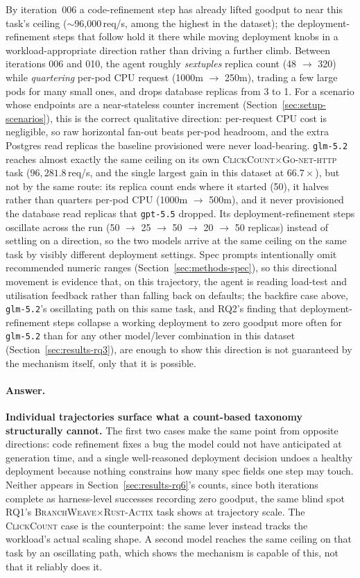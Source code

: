 By iteration~006 a code-refinement step has already lifted goodput to near this
task's ceiling ($\sim$96{,}000\,req/s, among the highest in the dataset);
the deployment-refinement steps that follow hold it there while moving deployment knobs in
a workload-appropriate direction rather than driving a further climb.
Between iterations 006 and 010, the agent roughly \emph{sextuples}
replica count (48 $\to$ 320) while \emph{quartering} per-pod CPU request
(1000m $\to$ 250m), trading a few large pods for many small ones, and
drops database replicas from 3 to 1. For a scenario whose endpoints are a
near-stateless counter increment (Section~\ref{sec:setup-scenarios}),
this is the correct qualitative direction: per-request CPU cost is
negligible, so raw horizontal fan-out beats per-pod headroom, and the
extra Postgres read replicas the baseline provisioned were never
load-bearing. \texttt{glm-5.2} reaches almost exactly the same ceiling on
its own \textsc{ClickCount}$\times$\textsc{Go-net-http} task
($96{,}281.8$\,req/s, and the single largest gain in this dataset at
$66.7\times$), but not by the same route: its replica count ends where it
started (50), it halves rather than quarters per-pod CPU
(1000m $\to$ 500m), and it never provisioned the database read replicas
that \texttt{gpt-5.5} dropped. Its deployment-refinement steps oscillate across the run
(50 $\to$ 25 $\to$ 50 $\to$ 20 $\to$ 50 replicas) instead of settling on a
direction, so the two models arrive at the same ceiling on the same task
by visibly different deployment settings. Spec prompts intentionally
omit recommended numeric ranges (Section~\ref{sec:methods-spec}), so this
directional movement is evidence that, on this trajectory, the agent is
reading load-test and utilisation feedback rather than falling back on
defaults; the backfire case above, \texttt{glm-5.2}'s oscillating path on
this same task, and RQ2's finding
that deployment-refinement steps collapse a working deployment to zero goodput
more often for \texttt{glm-5.2} than for any other model/lever combination
in this dataset (Section~\ref{sec:results-rq3}), are enough to show this
direction is not guaranteed by the mechanism itself, only that it is
possible.

\paragraph{Answer.}
\textbf{Individual trajectories surface what a count-based taxonomy
structurally cannot.} The first two cases make the same point from
opposite directions: code refinement fixes a bug the model could not have
anticipated at generation time, and a single well-reasoned deployment
decision undoes a healthy deployment because nothing constrains how many
spec fields one step may touch. Neither appears in
Section~\ref{sec:results-rq6}'s counts, since both iterations complete as
harness-level successes recording zero goodput, the same blind spot RQ1's
\textsc{BranchWeave}$\times$\textsc{Rust-Actix} task shows at trajectory
scale. The \textsc{ClickCount} case is the counterpoint: the same lever
instead tracks the workload's actual scaling shape. A second model
reaches the same ceiling on that task by an oscillating path, which shows
the mechanism is capable of this, not that it reliably does it.


